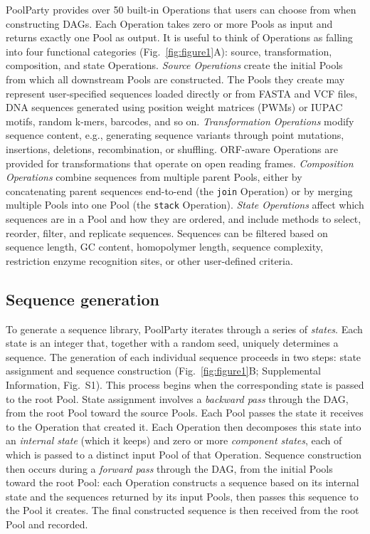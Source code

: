 \documentclass[pdflatex,sn-vancouver-num,referee,oneside]{sn-jnl}
\begin{document}
PoolParty provides over 50 built-in Operations that users can choose from when constructing DAGs. Each Operation takes zero or more Pools as input and returns exactly one Pool as output. It is useful to think of Operations as falling into four functional categories (Fig.~\ref{fig:figure1}A): source, transformation, composition, and state Operations. \emph{Source Operations} create the initial Pools from which all downstream Pools are constructed. The Pools they create may represent user-specified sequences loaded directly or from FASTA and VCF files, DNA sequences generated using position weight matrices (PWMs) or IUPAC motifs, random k-mers, barcodes, and so on. \emph{Transformation Operations} modify sequence content, e.g., generating sequence variants through point mutations, insertions, deletions, recombination, or shuffling. ORF-aware Operations are provided for transformations that operate on open reading frames. \emph{Composition Operations} combine sequences from multiple parent Pools, either by concatenating parent sequences end-to-end (the \texttt{join} Operation) or by merging multiple Pools into one Pool (the \texttt{stack} Operation). \emph{State Operations} affect which sequences are in a Pool and how they are ordered, and include methods to select, reorder, filter, and replicate sequences. Sequences can be filtered based on sequence length, GC content, homopolymer length, sequence complexity, restriction enzyme recognition sites, or other user-defined criteria.

\subsection*{Sequence generation}\label{subsec:sequence-generation}

To generate a sequence library, PoolParty iterates through a series of \emph{states}. Each state is an integer that, together with a random seed, uniquely determines a sequence. The generation of each individual sequence proceeds in two steps: state assignment and sequence construction (Fig.~\ref{fig:figure1}B; Supplemental Information, Fig.~S1). This process begins when the corresponding state is passed to the root Pool. State assignment involves a \emph{backward pass} through the DAG, from the root Pool toward the source Pools. Each Pool passes the state it receives to the Operation that created it. Each Operation then decomposes this state into an \emph{internal state} (which it keeps) and zero or more \emph{component states}, each of which is passed to a distinct input Pool of that Operation. Sequence construction then occurs during a \emph{forward pass} through the DAG, from the initial Pools toward the root Pool: each Operation constructs a sequence based on its internal state and the sequences returned by its input Pools, then passes this sequence to the Pool it creates. The final constructed sequence is then received from the root Pool and recorded.
\end{document}

